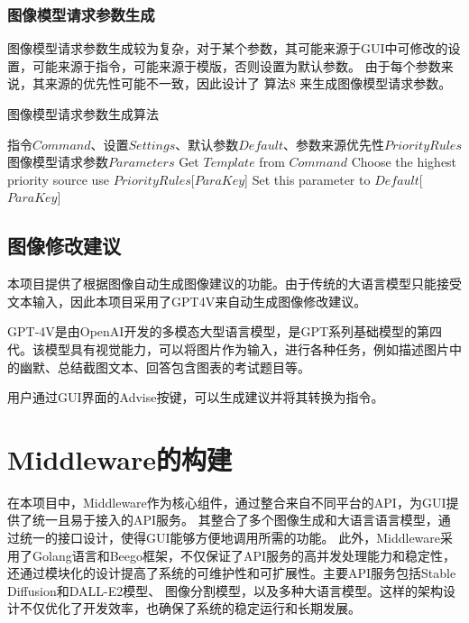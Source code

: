 \documentclass[a4paper,AutoFakeBold,oneside,12pt]{book}
\begin{document}
\subsubsection{图像模型请求参数生成}
图像模型请求参数生成较为复杂，对于某个参数，其可能来源于GUI中可修改的设置，可能来源于指令，可能来源于模版，否则设置为默认参数。
由于每个参数来说，其来源的优先性可能不一致，因此设计了 算法8 来生成图像模型请求参数。
\begin{algorithm} 
	\begin{spacing}{1.3}
		\caption{图像模型请求参数生成算法} 
		\label{ImageParasGenAlgorithm}
		\renewcommand{\algorithmicrequire}{\textbf{输入：}}
		\renewcommand{\algorithmicensure}{\textbf{输出：}} 
			\begin{algorithmic}[1] 
				\Require 指令$Command$、设置$Settings$、默认参数$Default$、参数来源优先性$PriorityRules$
				\Ensure 图像模型请求参数$Parameters$
                    \State Get $Template$ from $Command$
                        \State Choose the highest priority source use $PriorityRules$[$ParaKey$]
                    \Else
                        \State Set this parameter to $Default$[$ParaKey$]
                    \EndIf
                \EndFor
			\end{algorithmic}
	\end{spacing}
\end{algorithm}

\subsection{图像修改建议}
本项目提供了根据图像自动生成图像建议的功能。由于传统的大语言模型只能接受文本输入，因此本项目采用了GPT4V来自动生成图像修改建议。

GPT-4V是由OpenAI开发的多模态大型语言模型，是GPT系列基础模型的第四代。该模型具有视觉能力，可以将图片作为输入，进行各种任务，例如描述图片中的幽默、总结截图文本、回答包含图表的考试题目等。

用户通过GUI界面的Advise按键，可以生成建议并将其转换为指令。

\section{Middleware的构建} %
在本项目中，Middleware作为核心组件，通过整合来自不同平台的API，为GUI提供了统一且易于接入的API服务。
其整合了多个图像生成和大语言语言模型，通过统一的接口设计，使得GUI能够方便地调用所需的功能。
此外，Middleware采用了Golang语言和Beego框架，不仅保证了API服务的高并发处理能力和稳定性，
还通过模块化的设计提高了系统的可维护性和可扩展性。主要API服务包括Stable Diffusion和DALL-E2模型、
图像分割模型，以及多种大语言模型。这样的架构设计不仅优化了开发效率，也确保了系统的稳定运行和长期发展。
\end{document}
